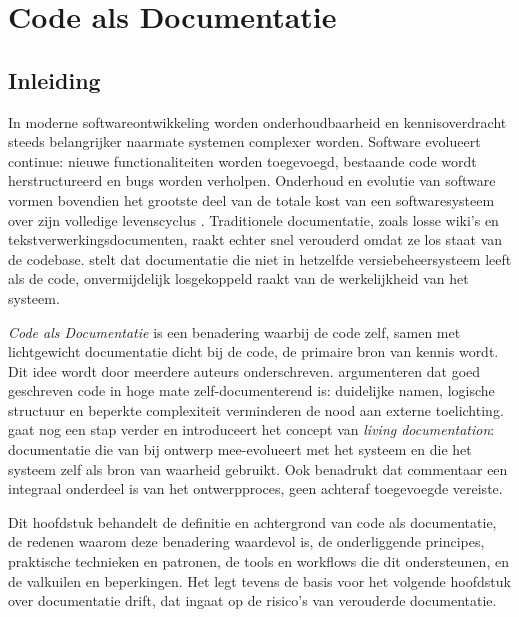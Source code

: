 \chapter{Code als Documentatie}
\label{ch:code-as-documentatie}

\section{Inleiding}
\label{sec:cad-intro}

In moderne softwareontwikkeling worden onderhoudbaarheid en kennisoverdracht steeds belangrijker naarmate systemen complexer worden.
Software evolueert continue: nieuwe functionaliteiten worden toegevoegd, bestaande code wordt herstructureerd en bugs worden verholpen.
Onderhoud en evolutie van software vormen bovendien het grootste deel van de totale kost van een softwaresysteem over zijn volledige levenscyclus \autocite{tripathy2014softwareevolution}.
Traditionele documentatie, zoals losse wiki's en tekstverwerkingsdocumenten, raakt echter snel verouderd omdat ze los staat van de codebase.
\textcite{gentle2017docslikecode} stelt dat documentatie die niet in hetzelfde versiebeheersysteem leeft als de code, onvermijdelijk losgekoppeld raakt van de werkelijkheid van het systeem.

\textit{Code als Documentatie} is een benadering waarbij de code zelf, samen met lichtgewicht documentatie dicht bij de code, de primaire bron van kennis wordt.
Dit idee wordt door meerdere auteurs onderschreven.
\textcite{boswell2011readablecode} argumenteren dat goed geschreven code in hoge mate zelf-documenterend is: duidelijke namen, logische structuur en beperkte complexiteit verminderen de nood aan externe toelichting.
\textcite{martraire2019livingdocumentation} gaat nog een stap verder en introduceert het concept van \textit{living documentation}: documentatie die van bij ontwerp mee-evolueert met het systeem en die het systeem zelf als bron van waarheid gebruikt.
Ook \textcite{ousterhout2018philosophy} benadrukt dat commentaar een integraal onderdeel is van het ontwerpproces, geen achteraf toegevoegde vereiste.

Dit hoofdstuk behandelt de definitie en achtergrond van code als documentatie, de redenen waarom deze benadering waardevol is, de onderliggende principes, praktische technieken en patronen, de tools en workflows die dit ondersteunen, en de valkuilen en beperkingen.
Het legt tevens de basis voor het volgende hoofdstuk over documentatie drift, dat ingaat op de risico's van verouderde documentatie.


